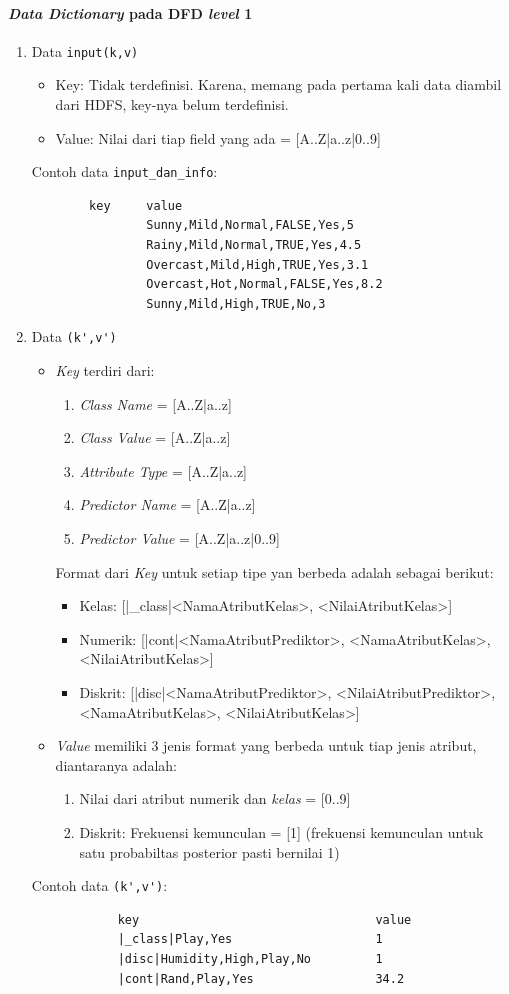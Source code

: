 \paragraph{\textit{Data Dictionary} pada DFD \textit{level} 1}
\begin{enumerate}
	\item{Data \verb|input(k,v)|}
		\begin{itemize}
			\item Key: Tidak terdefinisi. Karena, memang pada pertama kali data diambil dari HDFS, key-nya belum terdefinisi.
			\item Value: Nilai dari tiap field yang ada = [A..Z|a..z|0..9]
		\end{itemize}
		Contoh data \verb|input_dan_info|:
		\begin{lstlisting}
		key		value		
				Sunny,Mild,Normal,FALSE,Yes,5
				Rainy,Mild,Normal,TRUE,Yes,4.5
				Overcast,Mild,High,TRUE,Yes,3.1
				Overcast,Hot,Normal,FALSE,Yes,8.2
				Sunny,Mild,High,TRUE,No,3
		\end{lstlisting}
	\item{Data \verb|(k',v')|}
		\begin{itemize}
			\item \textit{Key} terdiri dari:
			\begin{enumerate}
				\item \textit{Class Name} = [A..Z|a..z] 
				\item \textit{Class Value} = [A..Z|a..z] 
				\item \textit{Attribute Type} = [A..Z|a..z] 
				\item \textit{Predictor Name} = [A..Z|a..z]
				\item \textit{Predictor Value} = [A..Z|a..z|0..9]
			\end{enumerate}
			Format dari \textit{Key} untuk setiap tipe yan berbeda adalah sebagai berikut:
			\begin{itemize}
				\item Kelas: [|\_class|<NamaAtributKelas>, <NilaiAtributKelas>]
				\item Numerik: [|cont|<NamaAtributPrediktor>, <NamaAtributKelas>, <NilaiAtributKelas>]
				\item Diskrit: [|disc|<NamaAtributPrediktor>, <NilaiAtributPrediktor>, <NamaAtributKelas>, <NilaiAtributKelas>]
			\end{itemize}						
			
			\item \textit{Value} memiliki 3 jenis format yang berbeda untuk tiap jenis atribut, diantaranya adalah: 
			\begin{enumerate}
				\item Nilai dari atribut numerik dan \textit{kelas} = [0..9]
				\item Diskrit: Frekuensi kemunculan = [1] (frekuensi kemunculan untuk satu probabiltas posterior pasti bernilai 1)
			\end{enumerate}
		\end{itemize}
			Contoh data \verb|(k',v')|:
			\begin{lstlisting}
			key									value		
			|_class|Play,Yes					1
			|disc|Humidity,High,Play,No			1
			|cont|Rand,Play,Yes					34.2
			\end{lstlisting}


\end{enumerate}
